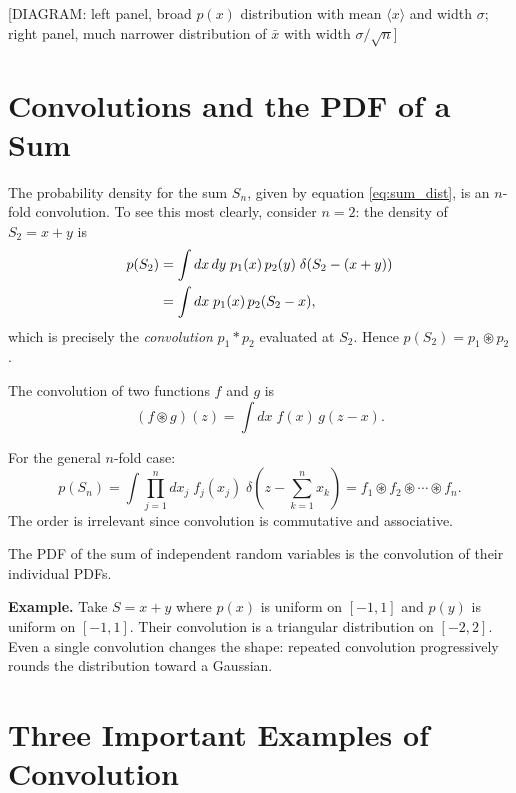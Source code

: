 \begin{center}[DIAGRAM: left panel, broad $p(x)$ distribution with mean $\langle x\rangle$ and width $\sigma$; right panel, much narrower distribution of $\bar{x}$ with width $\sigma/\sqrt{n}$]\end{center}

\section{Convolutions and the PDF of a Sum}

The probability density for the sum $S_n$, given by equation \eqref{eq:sum_dist}, is an $n$-fold convolution. To see this most clearly, consider $n = 2$: the density of $S_2 = x + y$ is
\begin{align}
    p(S_2) &= \int dx\, dy\; p_1(x)\, p_2(y)\;\delta(S_2 - (x+y)) \notag \\
    &= \int dx\; p_1(x)\, p_2(S_2 - x),
\end{align}
which is precisely the \emph{convolution} $p_1 * p_2$ evaluated at $S_2$. Hence $p(S_2) = p_1 \circledast p_2$.

\begin{definition}[Convolution]
The convolution of two functions $f$ and $g$ is
\begin{equation}
    (f \circledast g)(z) = \int dx\; f(x)\, g(z - x).
\end{equation}
\end{definition}

For the general $n$-fold case:
\begin{equation}
    p(S_n) = \int \prod_{j=1}^{n} dx_j\; f_j(x_j)\;\delta\!\left(z - \sum_{k=1}^{n} x_k\right) = f_1 \circledast f_2 \circledast \cdots \circledast f_n.
\end{equation}
The order is irrelevant since convolution is commutative and associative.

\begin{fact}
The PDF of the sum of independent random variables is the convolution of their individual PDFs.
\end{fact}

\textbf{Example.} Take $S = x + y$ where $p(x)$ is uniform on $[-1, 1]$ and $p(y)$ is uniform on $[-1, 1]$. Their convolution is a triangular distribution on $[-2, 2]$. Even a single convolution changes the shape: repeated convolution progressively rounds the distribution toward a Gaussian.

\section{Three Important Examples of Convolution}

